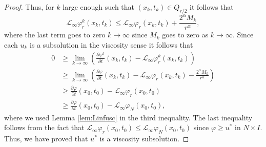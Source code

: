 \documentclass[10pt,a4paper]{amsart}
\providecommand{\Linf}{\mathcal{L}_{\infty}}
\providecommand{\Ns}{N \times I}
\begin{document}
\begin{proof}
Thus, for $k$ large enough such that $(x_k,t_k) \in Q_{r/2}$ it follows that
\begin{equation*}
    \Linf \varphi^k_{r}(x_k,t_k) \leq \Linf \varphi_{r}(x_k,t_k)+ \frac{2^{\alpha} M_k}{r^{\alpha}},
\end{equation*}
where the last term goes to zero $k \to \infty$ since $M_k$ goes to zero as $k \to \infty$. Since each $u_k$ is a subsolution in the viscosity sense it follows that
    \begin{align*}
       0 &\geq \lim_{k \to \infty} \left(\frac{\partial \varphi^k}{\partial t}(x_k, t_k) - \Linf \varphi_{r }^k(x_k, t_k) \right)\\
       &\geq \lim_{k \to \infty} \left(\frac{\partial \varphi}{\partial t}(x_k, t_k) - \Linf \varphi_{r }(x_k, t_k) -\frac{2^{\alpha} M_k}{r^{\alpha}}\right)\\
       &\geq \frac{\partial \varphi}{\partial t}(x_0, t_0) - \Linf \varphi_{r}(x_0, t_0)\\
       & \geq  \frac{\partial \varphi}{\partial t}(x_0, t_0) - \Linf \varphi_{N }(x_0, t_0),
    \end{align*}
where we used Lemma \ref{lem:Linfusc} in the third inequality. The last inequality follows from the fact that $\Linf \varphi_{r }(x_0, t_0) \leq  \Linf \varphi_{N }(x_0, t_0)$ since $\varphi \geq u^*$ in $\Ns$. Thus, we have proved that $u^*$ is a viscosity subsolution.
\end{proof}
\end{document}
